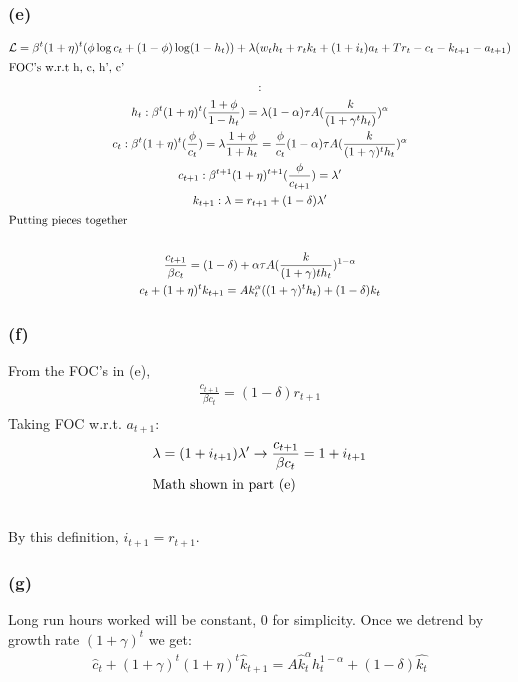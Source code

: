 \documentclass[10pt, a4paper]{article}
\begin{document}
    \subsubsection*{(e)}
      \begin{gather*}
        \mathcal{L} = \beta^t(1+\eta)^t(\phi\log c_t + (1-\phi)\log(1-h_t)) + \lambda(w_th_t + r_tk_t + (1+i_t)a_t + Tr_t - c_t - k_{t+1}-a_{t+1}) \\
        \shortintertext{FOC's w.r.t h, c, h', c'}: \\
        h_t: \beta^t(1+\eta)^t(\frac{1+\phi}{1-h_t}) =\lambda(1-\alpha)\tau A(\frac{k}{(1+\gamma^th_t)})^{\alpha} \\
        c_t: \beta^t(1+\eta)^t(\frac{\phi}{c_t}) = \lambda
        \frac{1+\phi}{1+h_t} = \frac{\phi}{c_t}(1-\alpha)\tau A(\frac{k}{(1+\gamma)^th_t})^{\alpha} \\
        c_{t+1}: \beta^{t+1}(1+\eta)^{t+1}(\frac{\phi}{c_{t+1}}) = \lambda' \\
        k_{t+1}: \lambda = r_{t+1}+(1-\delta)\lambda' \\
        \shortintertext{Putting pieces together} \\
        \frac{c_{t+1}}{\beta c_t} = (1-\delta)+\alpha\tau A(\frac{k}{(1+\gamma)th_t})^{1-\alpha} \\
        c_t + (1+\eta)^tk_{t+1}=Ak^{\alpha}_t((1+\gamma)^th_t)+(1-\delta)k_t \\
      \end{gather*}
    \subsubsection*{(f)}
      From the FOC's in (e),
      \begin{gather*}
        \frac{c_{t+1}}{\beta c_t} = (1-\delta)r_{t+1} \\
      \end{gather*}
      Taking FOC w.r.t. $a_{t+1}$:
      \begin{gather*}
        \lambda = (1+i_{t+1})\lambda' \rightarrow \frac{c_{t+1}}{\beta c_t} = 1+i_{t+1} \\
        \shortintertext{Math shown in part (e)} \\
      \end{gather*}
      By this definition, $i_{t+1}=r_{t+1}$.
    \subsubsection*{(g)}
      Long run hours worked will be constant, 0 for simplicity. Once we detrend by growth rate $(1+\gamma)^t$ we get:
      \begin{gather*}
        \hat{c}_t + (1+\gamma)^t(1+\eta)^t\hat{k}_{t+1}=A\hat{k}_t^{\alpha}h_t^{1-\alpha}+(1-\delta)\hat{k_t}
      \end{gather*}
\end{document}
